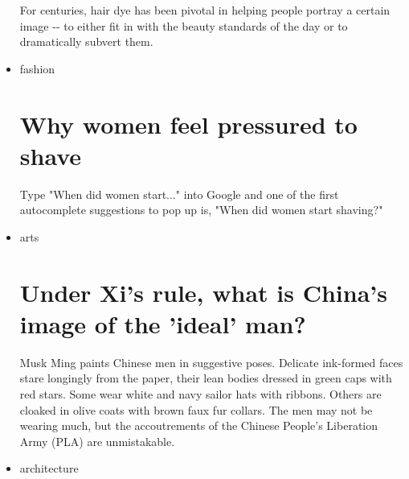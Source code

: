 \begin{itemize}
  \href{/style/article/hair-dye-evolution/index.html}{}

  For centuries, hair dye has been pivotal in helping people portray a
  certain image -\/- to either fit in with the beauty standards of the
  day or to dramatically subvert them.
\item
  \href{/style/fashion}{}

  fashion

  \href{/style/article/why-women-feel-pressured-to-shave/index.html}{}

  \hypertarget{why-women-feel-pressured-to-shave}{%
  \section{Why women feel pressured to
  shave}\label{why-women-feel-pressured-to-shave}}

  \href{/style/article/why-women-feel-pressured-to-shave/index.html}{}

  Type "When did women start..." into Google and one of the first
  autocomplete suggestions to pop up is, "When did women start shaving?"
\item
  \href{/style/arts}{}

  arts

  \href{/style/article/china-masculinity-intl-hnk/index.html}{}

  \hypertarget{under-xis-rule-what-is-chinas-image-of-the-ideal-man}{%
  \section{Under Xi's rule, what is China's image of the 'ideal'
  man?}\label{under-xis-rule-what-is-chinas-image-of-the-ideal-man}}

  \href{/style/article/china-masculinity-intl-hnk/index.html}{}

  Musk Ming paints Chinese men in suggestive poses. Delicate ink-formed
  faces stare longingly from the paper, their lean bodies dressed in
  green caps with red stars. Some wear white and navy sailor hats with
  ribbons. Others are cloaked in olive coats with brown faux fur
  collars. The men may not be wearing much, but the accoutrements of the
  Chinese People's Liberation Army (PLA) are unmistakable.
\item
  \href{/style/architecture}{}

  architecture

  \href{/style/article/anticipated-buildings-2020/index.html}{}


\end{itemize}
